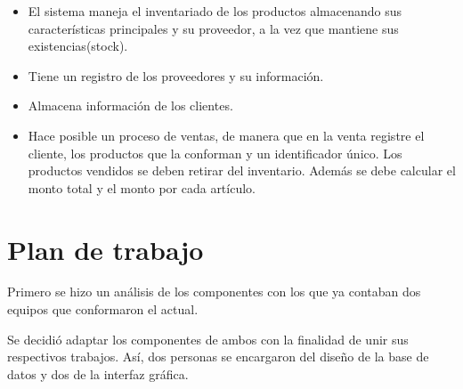 \documentclass[30pt,fleqn]{article}
\begin{document}
\begin{itemize}
\item El sistema maneja el inventariado de los productos almacenando sus características	principales y su proveedor, a la vez que mantiene sus existencias(stock).
\item Tiene un registro de los proveedores y su información.
\item Almacena información de los clientes.
\item Hace posible un proceso de ventas, de manera que en la venta registre el cliente, los  productos que la conforman y un identificador único. Los productos vendidos se deben retirar del inventario. Además se debe calcular el monto total y el monto por cada artículo.  
\end{itemize}


\vspace{5mm} %
\section{Plan de trabajo}

Primero se hizo un análisis de los componentes con los que ya contaban dos equipos que conformaron el actual. 

Se decidió adaptar los componentes de ambos con la finalidad de unir sus respectivos trabajos.
Así, dos personas se encargaron del diseño de la base de datos y dos de la interfaz gráfica. 

\vspace{5mm} %
\end{document}
